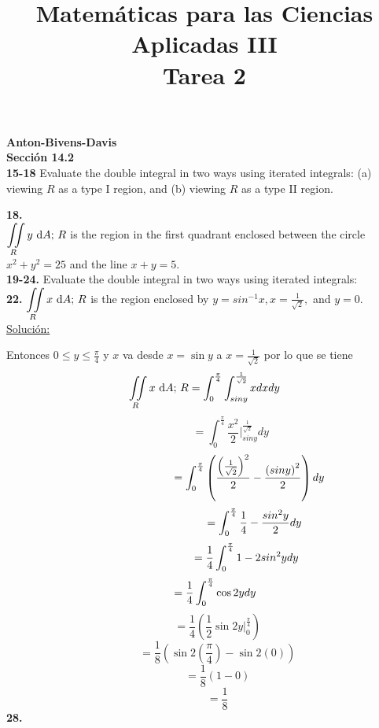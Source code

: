 \documentclass[11pt]{report}
\newcommand{\s}{\underline{Soluci\'{o}n:}}
\begin{document}
{}
\title{Matemáticas para las Ciencias Aplicadas III \\ Tarea 2}
\maketitle

\textbf{Anton-Bivens-Davis} \\

\textbf{Sección 14.2} \\

\textbf{15-18} Evaluate the double integral in two ways using iterated integrals:
(a) viewing $R$ as a type I region, and (b) viewing $R$ as a type II region.

\textbf{18.} \\

$ {\displaystyle \iint \limits_R } \, y \, \, \text dA; \, R$ is the region in the first
quadrant enclosed between the circle $x^2 + y^2 = 25$ and the line $x + y = 5$. \\

\textbf{19-24.} Evaluate the double integral in two ways using iterated integrals: \\

\textbf{22.} $ {\displaystyle \iint \limits_R } \, x \, \, \text dA; \, R$ is the region
enclosed by $y = sin^{-1} x, x = \frac{1}{\sqrt{2}},$ and $y = 0$. \\

\s

Entonces $0 \leq y \leq \frac{\pi}{4}$ y $x$ va desde
$x = \sin y$ a $ x = \frac{1}{\sqrt{2}}$  por lo que se tiene
\[{\displaystyle \iint \limits_R } \, x \, \, \text dA; \, R = \int^{\frac{\pi}{4}}_{0}\int^{\frac{1}{\sqrt{2}}}_{sin y} x dx dy\]
\[\hspace{2cm}= \int^{\frac{\pi}{4}}_{0} \frac{x^2}{2} \Big|^{\frac{1}{\sqrt{2}}}_{sin y} dy \]
\[\hspace{2.9cm}= \int^{\frac{\pi}{4}}_{0} \left(\frac{\left(\frac{1}{\sqrt{2}}\right)^2}{2} - \frac{\left(sin y\right)^2}{2} \right) dy \]
\[\hspace{3.2cm}= \int^{\frac{\pi}{4}}_{0} \frac{1}{4} - \frac{sin^2y}{2} dy\]
\[\hspace{2.7cm}= \frac{1}{4}\int^{\frac{\pi}{4}}_{0} 1 - 2 sin^2y dy\]
\[\hspace{0.7 cm}= \frac{1}{4}\int^{\frac{\pi}{4}}_{0} \cos 2y dy \]
\[\hspace{1cm}= \frac{1}{4}\left(\frac{1}{2}\sin2y\Big|^{\frac{\pi}{4}}_{0}\right)\]
\[\hspace{1cm}= \frac{1}{8}\left(\sin2\left(\frac{\pi}{4}\right) - \sin2(0)\right)\]
\[\hspace{1cm}= \frac{1}{8}\left(1 - 0\right)\]
\[\hspace{1cm}= \frac{1}{8}\]
\textbf{28.} \\
\end{document}
